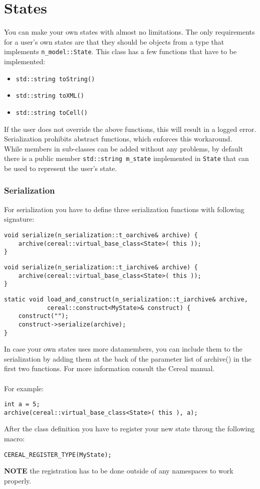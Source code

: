 \section{States}
You can make your own states with almost no limitations. The only requirements for a user's own states are that they should be objects from a type that implements \texttt{n\_model::State}. This class has a few functions that have to be implemented:
\begin{itemize}
	\item \texttt{std::string toString()}
	\item \texttt{std::string toXML()}
	\item \texttt{std::string toCell()}
\end{itemize}
If the user does not override the above functions, this will result in a logged error. Serialization prohibits abstract functions, which enforces this workaround.\\
While members in sub-classes can be added without any problems, by default there is a public member \texttt{std::string m\_state} implemented in \texttt{State} that can be used to represent the user's state.

\subsubsection{Serialization}
For serialization you have to define three serialization functions with following signature: 
\begin{lstlisting}
void serialize(n_serialization::t_oarchive& archive) {
	archive(cereal::virtual_base_class<State>( this ));
}
\end{lstlisting}
\begin{lstlisting}
void serialize(n_serialization::t_iarchive& archive) {
	archive(cereal::virtual_base_class<State>( this ));
}
\end{lstlisting}
\begin{lstlisting}
static void load_and_construct(n_serialization::t_iarchive& archive,
			cereal::construct<MyState>& construct) {
	construct("");
	construct->serialize(archive);
}
\end{lstlisting}
In case your own states uses more datamembers, you can include them to the serialization by adding them at the back of the parameter list of archive() in the first two functions. For more information consult the Cereal manual.\\
\\ 
For example:
\begin{lstlisting}
int a = 5;
archive(cereal::virtual_base_class<State>( this ), a);
\end{lstlisting}
After the class definition you have to register your new state throug the following macro: 
\begin{lstlisting}
CEREAL_REGISTER_TYPE(MyState);
\end{lstlisting}
\textbf{NOTE} the registration has to be done outside of any namespaces to work properly. 

